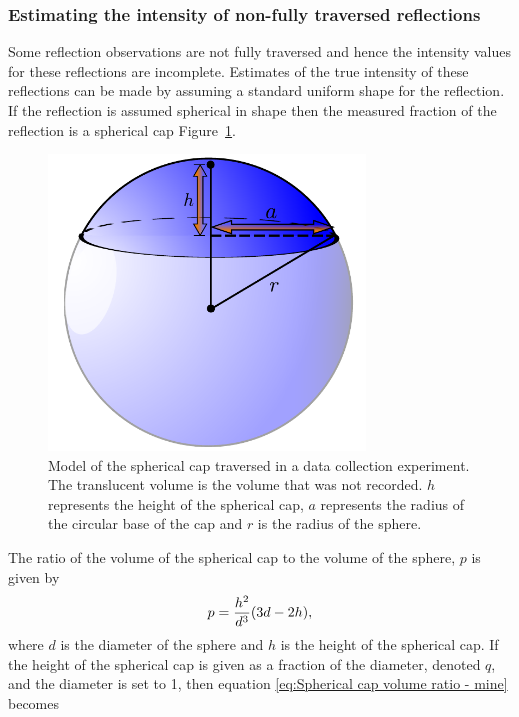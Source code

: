 \subsubsection{Estimating the intensity of non-fully traversed reflections}
\label{subs:Estimating the intensity of non-fully traversed reflections}
Some reflection observations are not fully traversed and hence the intensity values for these reflections are incomplete.
Estimates of the true intensity of these reflections can be made by assuming a standard uniform shape for the reflection.
If the reflection is assumed spherical in shape then the measured fraction of the reflection is a spherical cap Figure~\ref{fig:Spherical Cap}.
\begin{figure}[ht!]
    \centering
    \includegraphics[width=0.75\textwidth]{figures/datared/SphericalCap.pdf}
    \caption[Model of the spherical cap traversed in a data collection experiment.]{Model of the spherical cap traversed in a data collection experiment.
    The translucent volume is the volume that was not recorded.
    $h$ represents the height of the spherical cap, $a$ represents the radius of the circular base of the cap and $r$ is the radius of the sphere.}
    \label{fig:Spherical Cap}
\end{figure}
The ratio of the volume of the spherical cap to the volume of the sphere, $p$ is given by
\begin{equation}
    p = \frac{h^2}{d^3} (3d - 2h),
    \label{eq:Spherical cap volume ratio - mine}
\end{equation}
where $d$ is the diameter of the sphere and $h$ is the height of the spherical cap.
If the height of the spherical cap is given as a fraction of the diameter, denoted $q$, and the diameter is set to 1, then equation \ref{eq:Spherical cap volume ratio - mine} becomes
